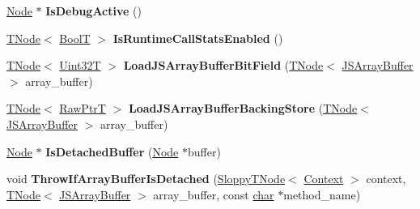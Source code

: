 \begin{DoxyCompactItemize}
\mbox{\label{classv8_1_1internal_1_1CodeStubAssembler_a970c80697e4cf08e0ea6065454363db6}} 
\mbox{\hyperlink{classv8_1_1internal_1_1compiler_1_1Node}{Node}} $\ast$ {\bfseries Is\+Debug\+Active} ()
\item 
\mbox{\label{classv8_1_1internal_1_1CodeStubAssembler_afab5b358534f962bb215f56666db598e}} 
\mbox{\hyperlink{classv8_1_1internal_1_1compiler_1_1TNode}{T\+Node}}$<$ \mbox{\hyperlink{structv8_1_1internal_1_1BoolT}{BoolT}} $>$ {\bfseries Is\+Runtime\+Call\+Stats\+Enabled} ()
\item 
\mbox{\label{classv8_1_1internal_1_1CodeStubAssembler_a41a8728ce8acdc2799ecf51cc90e8172}} 
\mbox{\hyperlink{classv8_1_1internal_1_1compiler_1_1TNode}{T\+Node}}$<$ \mbox{\hyperlink{structv8_1_1internal_1_1Uint32T}{Uint32T}} $>$ {\bfseries Load\+J\+S\+Array\+Buffer\+Bit\+Field} (\mbox{\hyperlink{classv8_1_1internal_1_1compiler_1_1TNode}{T\+Node}}$<$ \mbox{\hyperlink{classv8_1_1internal_1_1JSArrayBuffer}{J\+S\+Array\+Buffer}} $>$ array\+\_\+buffer)
\item 
\mbox{\label{classv8_1_1internal_1_1CodeStubAssembler_ab222ebc5e6743c9ab72ad30b22682b29}} 
\mbox{\hyperlink{classv8_1_1internal_1_1compiler_1_1TNode}{T\+Node}}$<$ \mbox{\hyperlink{structv8_1_1internal_1_1RawPtrT}{Raw\+PtrT}} $>$ {\bfseries Load\+J\+S\+Array\+Buffer\+Backing\+Store} (\mbox{\hyperlink{classv8_1_1internal_1_1compiler_1_1TNode}{T\+Node}}$<$ \mbox{\hyperlink{classv8_1_1internal_1_1JSArrayBuffer}{J\+S\+Array\+Buffer}} $>$ array\+\_\+buffer)
\item 
\mbox{\label{classv8_1_1internal_1_1CodeStubAssembler_ae1c74e2a4168d39fb30e9e54b2fa6e98}} 
\mbox{\hyperlink{classv8_1_1internal_1_1compiler_1_1Node}{Node}} $\ast$ {\bfseries Is\+Detached\+Buffer} (\mbox{\hyperlink{classv8_1_1internal_1_1compiler_1_1Node}{Node}} $\ast$buffer)
\item 
\mbox{\label{classv8_1_1internal_1_1CodeStubAssembler_a584f108466fa0fc19a4cf9de52cc017f}} 
void {\bfseries Throw\+If\+Array\+Buffer\+Is\+Detached} (\mbox{\hyperlink{classv8_1_1internal_1_1compiler_1_1SloppyTNode}{Sloppy\+T\+Node}}$<$ \mbox{\hyperlink{classv8_1_1internal_1_1Context}{Context}} $>$ context, \mbox{\hyperlink{classv8_1_1internal_1_1compiler_1_1TNode}{T\+Node}}$<$ \mbox{\hyperlink{classv8_1_1internal_1_1JSArrayBuffer}{J\+S\+Array\+Buffer}} $>$ array\+\_\+buffer, const \mbox{\hyperlink{classchar}{char}} $\ast$method\+\_\+name)

\end{DoxyCompactItemize}
